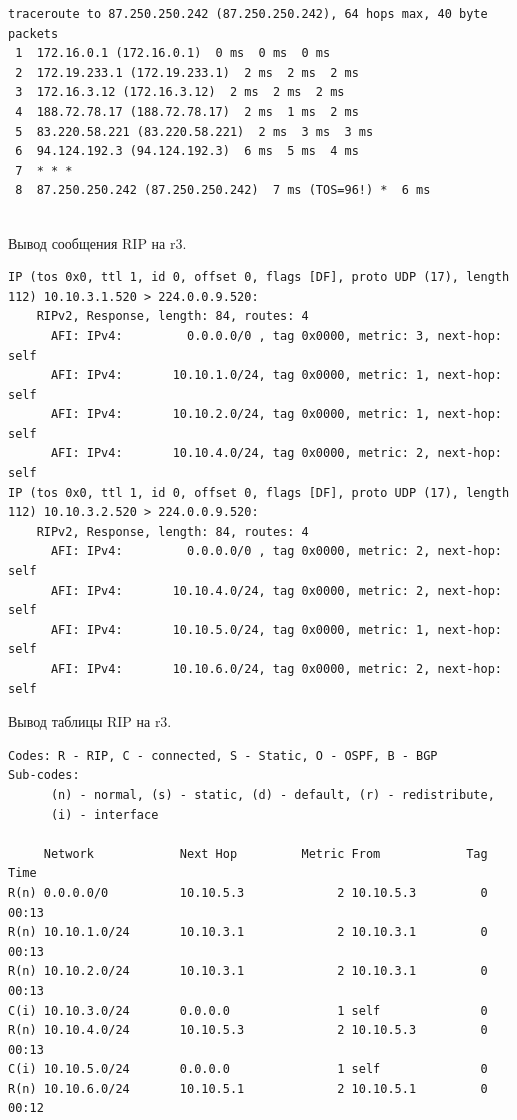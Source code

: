 \documentclass[a4paper,12pt]{article}
\begin{document}
\begin{Verbatim}
traceroute to 87.250.250.242 (87.250.250.242), 64 hops max, 40 byte packets
 1  172.16.0.1 (172.16.0.1)  0 ms  0 ms  0 ms
 2  172.19.233.1 (172.19.233.1)  2 ms  2 ms  2 ms
 3  172.16.3.12 (172.16.3.12)  2 ms  2 ms  2 ms
 4  188.72.78.17 (188.72.78.17)  2 ms  1 ms  2 ms
 5  83.220.58.221 (83.220.58.221)  2 ms  3 ms  3 ms
 6  94.124.192.3 (94.124.192.3)  6 ms  5 ms  4 ms
 7  * * *
 8  87.250.250.242 (87.250.250.242)  7 ms (TOS=96!) *  6 ms
 
\end{Verbatim}

Вывод сообщения RIP на r3.

\begin{Verbatim}
IP (tos 0x0, ttl 1, id 0, offset 0, flags [DF], proto UDP (17), length 112) 10.10.3.1.520 > 224.0.0.9.520: 
	RIPv2, Response, length: 84, routes: 4
	  AFI: IPv4:         0.0.0.0/0 , tag 0x0000, metric: 3, next-hop: self
	  AFI: IPv4:       10.10.1.0/24, tag 0x0000, metric: 1, next-hop: self
	  AFI: IPv4:       10.10.2.0/24, tag 0x0000, metric: 1, next-hop: self
	  AFI: IPv4:       10.10.4.0/24, tag 0x0000, metric: 2, next-hop: self
IP (tos 0x0, ttl 1, id 0, offset 0, flags [DF], proto UDP (17), length 112) 10.10.3.2.520 > 224.0.0.9.520: 
	RIPv2, Response, length: 84, routes: 4
	  AFI: IPv4:         0.0.0.0/0 , tag 0x0000, metric: 2, next-hop: self
	  AFI: IPv4:       10.10.4.0/24, tag 0x0000, metric: 2, next-hop: self
	  AFI: IPv4:       10.10.5.0/24, tag 0x0000, metric: 1, next-hop: self
	  AFI: IPv4:       10.10.6.0/24, tag 0x0000, metric: 2, next-hop: self
\end{Verbatim}

Вывод таблицы RIP на r3.

\begin{Verbatim}
Codes: R - RIP, C - connected, S - Static, O - OSPF, B - BGP
Sub-codes:
      (n) - normal, (s) - static, (d) - default, (r) - redistribute,
      (i) - interface

     Network            Next Hop         Metric From            Tag Time
R(n) 0.0.0.0/0          10.10.5.3             2 10.10.5.3         0 00:13
R(n) 10.10.1.0/24       10.10.3.1             2 10.10.3.1         0 00:13
R(n) 10.10.2.0/24       10.10.3.1             2 10.10.3.1         0 00:13
C(i) 10.10.3.0/24       0.0.0.0               1 self              0
R(n) 10.10.4.0/24       10.10.5.3             2 10.10.5.3         0 00:13
C(i) 10.10.5.0/24       0.0.0.0               1 self              0
R(n) 10.10.6.0/24       10.10.5.1             2 10.10.5.1         0 00:12

\end{Verbatim}
\end{document}
